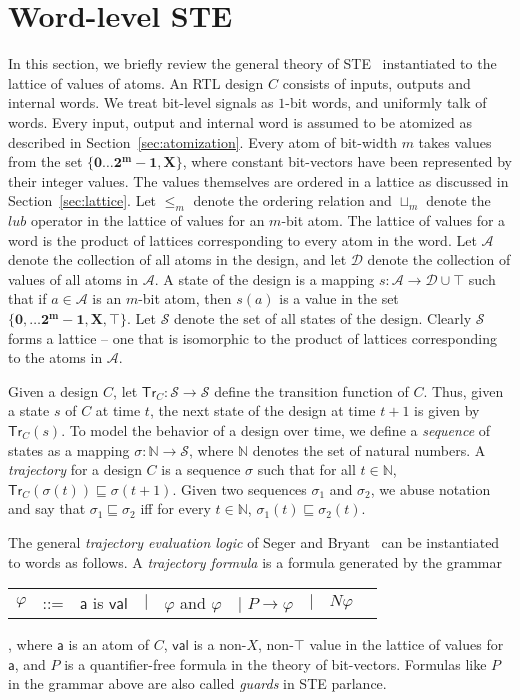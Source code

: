 \documentclass{llncs}
\newcommand{\tr}{\ensuremath{\mathsf{Tr}}}
\newcommand{\mc}[1]{\ensuremath{\mathcal{{#1}}}}
\begin{document}
\section{Word-level STE}\label{sec:wste}
In this section, we briefly review the general theory of
STE~\cite{SegerBryant95} instantiated to the lattice of values of
atoms.  An RTL design $C$ consists of inputs, outputs and internal
words.  We treat bit-level signals as $1$-bit words, and uniformly
talk of words.  Every input, output and internal word is assumed to be
atomized as described in Section~\ref{sec:atomization}.  Every atom of
bit-width $m$ takes values from the set $\{\mathbf{0} \ldots
\mathbf{2^m-1}, \mathbf{X}\}$, where constant bit-vectors have been
represented by their integer values.  The values themselves are
ordered in a lattice as discussed in Section~\ref{sec:lattice}.  Let
$\leq_m$ denote the ordering relation and $\sqcup_m$ denote the $lub$
operator in the lattice of values for an $m$-bit atom.  The lattice of
values for a word is the product of lattices corresponding to every
atom in the word.  Let $\mc{A}$ denote the collection of all
atoms in the design, and let $\mc{D}$ denote the collection
of values of all atoms in $\mc{A}$.  A state of the design
is a mapping $s: \mc{A} \rightarrow \mc{D} \cup {\top}$ such that if
$a \in \mc{A}$ is an $m$-bit atom, then $s(a)$ is a value in the set
$\{\mathbf{0}, \ldots \mathbf{2^m-1}, \mathbf{X}, \top\}$.  Let
$\mc{S}$ denote the set of all states of the design.  Clearly $\mc{S}$
forms a lattice -- one that is isomorphic to the product of lattices
corresponding to the atoms in $\mc{A}$.  

Given a design $C$, let ${\tr}_C: \mc{S} \rightarrow \mc{S}$ define
the transition function of $C$.  Thus, given a state $s$ of $C$ at
time $t$, the next state of the design at time $t+1$ is given by
${\tr}_C(s)$.  To model the behavior of a design over time, we define
a \emph{sequence} of states as a mapping $\sigma: \mathbb{N}
\rightarrow \mc{S}$, where $\mathbb{N}$ denotes the set of natural
numbers.  A \emph{trajectory} for a design $C$ is a sequence $\sigma$
such that for all $t \in \mathbb{N}$, ${\tr}_C(\sigma(t)) \sqsubseteq
\sigma(t+1)$.  Given two sequences $\sigma_1$ and $\sigma_2$, we abuse
notation and say that $\sigma_1 \sqsubseteq \sigma_2$ iff for every $t
\in \mathbb{N}$, $\sigma_1(t) \sqsubseteq \sigma_2(t)$.

The general \emph{trajectory evaluation logic} of Seger and
Bryant~\cite{SegerBryant95} can be instantiated to words as follows.
A \emph{trajectory formula} is a formula generated by the grammar
\begin{tabular}{lllllllll}
$\varphi$ & ::= & $\mathsf{a}$ is $\mathsf{val}$ & $\mid$ & $\varphi$ and $\varphi$ & $\mid$
                  $P \rightarrow \varphi$ & $\mid$ & $N \varphi$  &
\end{tabular}, where
$\mathsf{a}$ is an atom of $C$, $\mathsf{val}$ is a non-$X$,
non-$\top$ value in the lattice of values for $\mathsf{a}$, and $P$ is
a quantifier-free formula in the theory of bit-vectors.  Formulas like
$P$ in the grammar above are also called \emph{guards} in STE
parlance.
\end{document}
